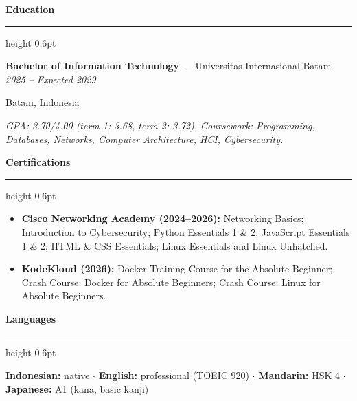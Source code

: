 \documentclass[10pt,a4paper]{article}
\newcommand{\cvsection}[1]{%
  \vspace{3pt}%
  {\large\bfseries #1}\par\vspace{1pt}%
  \hrule height 0.6pt\vspace{2pt}%
}
\newcommand{\cventry}[4]{%
  \textbf{#1} --- #2 \hfill \textit{#4}\par
  {\small #3}\par
}
\begin{document}
\cvsection{Education}

\cventry{Bachelor of Information Technology}{Universitas Internasional Batam}{Batam, Indonesia}{2025 -- Expected 2029}
\textit{GPA: 3.70/4.00 (term 1: 3.68, term 2: 3.72). Coursework: Programming, Databases, Networks, Computer Architecture, HCI, Cybersecurity.}

\cvsection{Certifications}

\begin{itemize}
  \item \textbf{Cisco Networking Academy (2024--2026):} Networking Basics; Introduction to Cybersecurity; Python Essentials 1 \& 2; JavaScript Essentials 1 \& 2; HTML \& CSS Essentials; Linux Essentials and Linux Unhatched.
  \item \textbf{KodeKloud (2026):} Docker Training Course for the Absolute Beginner; Crash Course: Docker for Absolute Beginners; Crash Course: Linux for Absolute Beginners.
\end{itemize}

\cvsection{Languages}

\textbf{Indonesian:} native $\cdot$ \textbf{English:} professional (TOEIC 920) $\cdot$ \textbf{Mandarin:} HSK 4 $\cdot$ \textbf{Japanese:} A1 (kana, basic kanji)
\end{document}
